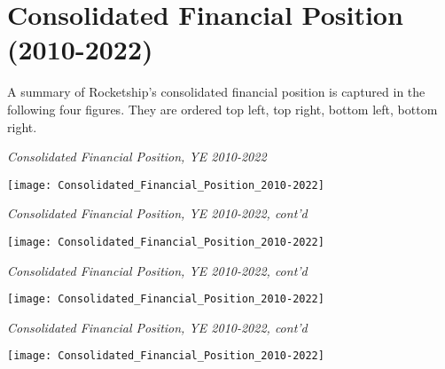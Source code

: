 
\chapter{Consolidated Financial Position (2010-2022)}
\label{ch:consolidated_financial_position}

A summary of Rocketship's consolidated financial position is captured in the following four figures. They are ordered top left, top right, bottom left, bottom right.

\begin{sidewaystable}\vspace{1.5in}
  \caption[Consolidated Financial Position, Years Ending 2010–2022]{\textit{Consolidated Financial Position, YE 2010-2022}}%
  \label{tab:consolidated_financial_position}
  \texttt{[image: Consolidated\_Financial\_Position\_2010-2022]} %
\end{sidewaystable}

  \begin{sidewaystable}\vspace{1.5in}
  \centering
    \caption*{\textit{Consolidated Financial Position, YE 2010-2022, cont'd}}
    \texttt{[image: Consolidated\_Financial\_Position\_2010-2022]} %
  \end{sidewaystable}

  \begin{sidewaystable}\vspace{0.8in}
  \centering
    \caption*{\textit{Consolidated Financial Position, YE 2010-2022, cont'd}}
    \texttt{[image: Consolidated\_Financial\_Position\_2010-2022]} %
  \end{sidewaystable}

  \begin{sidewaystable}\vspace{0.8in}
  \centering
    \caption*{\textit{Consolidated Financial Position, YE 2010-2022, cont'd}}
    \texttt{[image: Consolidated\_Financial\_Position\_2010-2022]} %
  \end{sidewaystable}
  
